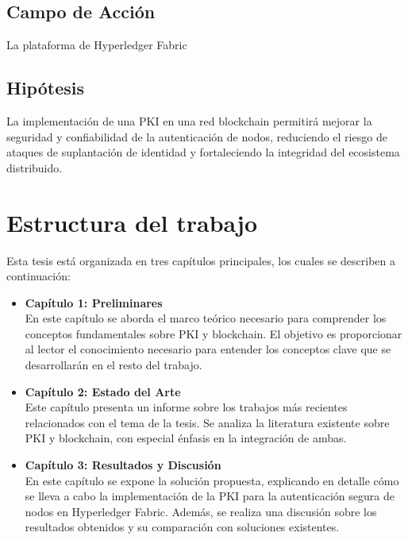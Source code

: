 \subsection*{Campo de Acción}
La plataforma de Hyperledger Fabric

\subsection*{Hipótesis}
La implementación de una PKI en una red blockchain permitirá mejorar la seguridad y confiabilidad de la autenticación de nodos, reduciendo el riesgo de ataques de suplantación de identidad y fortaleciendo la integridad del ecosistema distribuido.

\section{Estructura del trabajo}

Esta tesis está organizada en tres capítulos principales, los cuales se describen a continuación:

\begin{itemize}
    \item \textbf{Capítulo 1: Preliminares} \\
    En este capítulo se aborda el marco teórico necesario para comprender los conceptos fundamentales sobre PKI y blockchain. El objetivo es proporcionar al lector el conocimiento necesario para entender los conceptos clave que se desarrollarán en el resto del trabajo.
    
    \item \textbf{Capítulo 2: Estado del Arte} \\
    Este capítulo presenta un informe sobre los trabajos más recientes relacionados con el tema de la tesis. Se analiza la literatura existente sobre PKI y blockchain, con especial énfasis en la integración de ambas.
    
    \item \textbf{Capítulo 3: Resultados y Discusión} \\
    En este capítulo se expone la solución propuesta, explicando en detalle cómo se lleva a cabo la implementación de la PKI para la autenticación segura de nodos en Hyperledger Fabric. Además, se realiza una discusión sobre los resultados obtenidos y su comparación con soluciones existentes.
\end{itemize}
